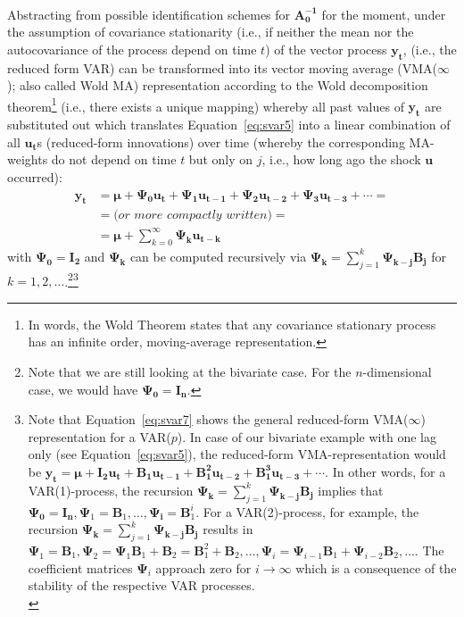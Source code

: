 \documentclass[a4paper,11pt,listof=nochaptergap,oneside,pointednumbers,bibtotoc,bigheadings,liststotoc]{scrbook}
\theoremstyle{mysatz}
\theoremstyle{mydefinition}
\theoremstyle{mybemerkung}
\newcommand{\vect}[1]{\boldsymbol{\mathbf{#1}}}
\begin{document}
\begin{itemize}
\\
Abstracting from possible identification schemes for $\vect{A_0^{-1}}$ for the moment, under the assumption of covariance stationarity (i.e., if neither the mean nor the autocovariance of the process depend on time $t$) of the vector process $\vect{y_t}$, \vect{y_t} (i.e., the reduced form VAR) can be transformed into its vector moving average (VMA($\infty$); also called Wold MA) representation according to the Wold decomposition theorem\footnote{In words, the Wold Theorem states that any covariance stationary process has an infinite order, moving-average representation.} (i.e., there exists a unique mapping) whereby all past values of $\vect{y_t}$ are substituted out which translates Equation~\ref{eq:svar5} into a linear combination of all $\vect{u_t}$s (reduced-form innovations) over time (whereby the corresponding MA-weights do not depend on time $t$ but only on $j$, i.e., how long ago the shock $\vect{u}$ occurred):
\begin{equation} \label{eq:svar7}
\begin{split}
 			\vect{y_t} & = \vect{\mu} + \vect{\Psi_0}\vect{u_t} + \vect{\Psi_1}\vect{u_{t-1}} + \vect{\Psi_{2}}\vect{u_{t-2}} + \vect{\Psi_{3}}\vect{u_{t-3}} + \cdots = \\
			& = \textit{(or more compactly written)} = \\
			& = \vect{\mu} + \sum\limits_{k=0}^\infty \vect{\Psi_k}\vect{u_{t-k}}
\end{split}								
\end{equation}
with $\vect{\Psi_0} =\vect{\mathbf{I_2}}$ and $\vect{\Psi_k}$ can be computed recursively via $\vect{\Psi_k} = \sum\limits_{j=1}^k \vect{\Psi_{k-j}\vect{B_j}}$ for $k=1, 2, \dots$.\footnote{Note that we are still looking at the bivariate case. For the $n$-dimensional case, we would have $\vect{\Psi_0} =\vect{\mathbf{I_n}}$.}\footnote{Note that Equation~\ref{eq:svar7} shows the general reduced-form VMA($\infty$) representation for a VAR($p$). In case of our bivariate example with one lag only (see Equation~\ref{eq:svar5}), the reduced-form VMA-representation would be $\vect{y_t} = \vect{\mu} + \vect{I_2}\vect{u_t} + \vect{{B}_1}\vect{u_{t-1}} + \vect{{B}_1^2}\vect{u_{t-2}} + \vect{{B}_1^3}\vect{u_{t-3}} + \cdots$. In other words, for a VAR(1)-process, the recursion $\vect{\Psi_k} = \sum\limits_{j=1}^k \vect{\Psi_{k-j}\vect{B_j}}$ implies that $\vect{\Psi_0}=\vect{I_n}, \vect{\Psi}_1 = \vect{B}_1, \dots, \vect{\Psi_i} = {\vect{B}}_1^i$. For a VAR(2)-process, for example, the recursion $\vect{\Psi_k} = \sum\limits_{j=1}^k \vect{\Psi_{k-j}\vect{B_j}}$ results in $\vect{\Psi}_1 = \vect{B}_1, \vect{\Psi}_2 = \vect{\Psi}_1\vect{B}_1 + \vect{B}_2 = \vect{B}_1^2 + \vect{B}_2, \dots, \vect{\Psi}_i = \vect{\Psi}_{i-1}\vect{B}_1 + \vect{\Psi}_{i-2}\vect{B}_2, \dots$. The coefficient matrices $\vect{\Psi}_i$ approach zero for $i \to \infty$ which is a consequence of the stability of the respective VAR processes.\\
}
\end{itemize}
\end{document}
